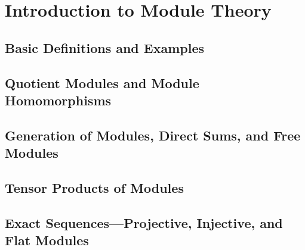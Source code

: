 \chapter{Introduction to Module Theory}

\section{Basic Definitions and Examples}

\section{Quotient Modules and Module Homomorphisms}

\section{Generation of Modules, Direct Sums, and Free Modules}

\section{Tensor Products of Modules}

\section{Exact Sequences—Projective, Injective, and Flat Modules}
